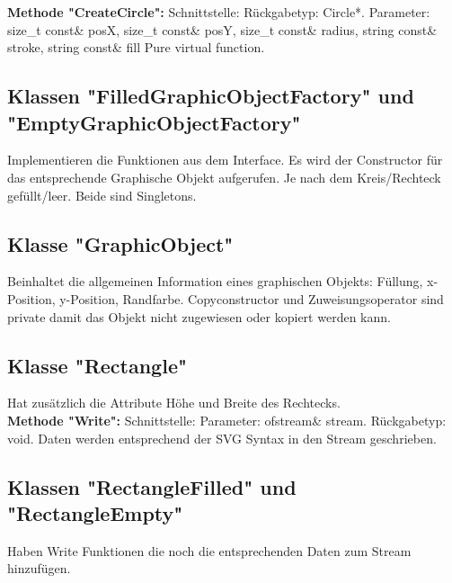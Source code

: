 \documentclass[12pt,a4paper]{article}
\begin{document}
\textbf {Methode "CreateCircle": } 
\newline
Schnittstelle: 
\newline
Rückgabetyp: Circle*.
\newline
Parameter: size\_t const\& posX, size\_t const\& posY, size\_t const\& radius, string const\& stroke, string const\& fill
\newline
Pure virtual function.
\\


\subsection {Klassen "FilledGraphicObjectFactory" und "EmptyGraphicObjectFactory"}
Implementieren die Funktionen aus dem Interface. Es wird der Constructor für das entsprechende Graphische Objekt aufgerufen. Je nach dem Kreis/Rechteck gefüllt/leer. Beide sind Singletons.
\\

\subsection {Klasse "GraphicObject"}
Beinhaltet die allgemeinen Information eines graphischen Objekts: Füllung, x-Position, y-Position, Randfarbe. Copyconstructor und Zuweisungsoperator sind private damit das Objekt nicht zugewiesen oder kopiert werden kann.
\\

\subsection {Klasse "Rectangle"}
Hat zusätzlich die Attribute Höhe und Breite des Rechtecks.
\\

\textbf {Methode "Write": } 
\newline
Schnittstelle:
Parameter: ofstream\& stream.
\newline
Rückgabetyp: void.
\newline
Daten werden entsprechend der SVG Syntax in den Stream geschrieben.
\\

\subsection {Klassen "RectangleFilled" und "RectangleEmpty"}
Haben Write Funktionen die noch die entsprechenden Daten zum Stream hinzufügen.
\\
\end{document}
